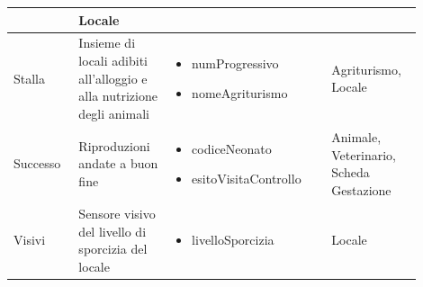 \documentclass[12pt,a4paper]{article}
\begin{document}
\begin{center}
\begin{longtable}{|p{0.14\linewidth}|p{0.20\linewidth}|p{0.36\linewidth}|p{0.20\linewidth}|}
\begin{itemize}
					\end{itemize}
					&  Locale \\

\hline
Stalla 				&  Insieme di locali adibiti all'alloggio e alla nutrizione degli animali  
					& \begin{itemize}
						\setlength{\itemindent}{-1em}
						\vspace{-25pt}
						\setlength\itemsep{-0.25em}
						\item numProgressivo
						\item nomeAgriturismo
					\end{itemize} 
					&  Agriturismo, Locale  \\

\hline
Successo				&  Riproduzioni andate a buon fine 
					& \begin{itemize}
						\setlength{\itemindent}{-1em}
						\vspace{-25pt}
						\setlength\itemsep{-0.25em}
						\item codiceNeonato
						\item esitoVisitaControllo
					\end{itemize}
					&  Animale, Veterinario, Scheda Gestazione \\

\hline
Visivi 				&  Sensore visivo del livello di sporcizia del locale  
					& \begin{itemize}
						\setlength{\itemindent}{-1em}
						\vspace{-25pt}
						\setlength\itemsep{-0.25em}
						\item livelloSporcizia
					\end{itemize}
					&  Locale \\

\hline

\end{longtable}
\end{center}
\end{document}
